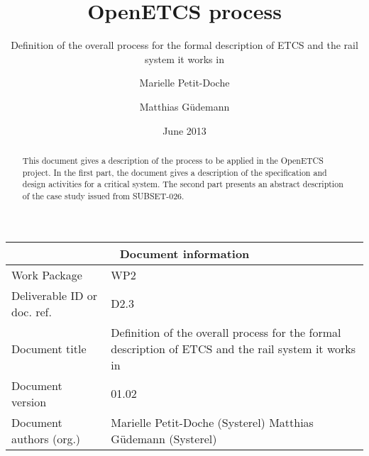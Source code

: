 \documentclass{template/openetcs_article}
\begin{document}
\frontmatter
{}




\title{OpenETCS process}

\subtitle{Definition of the overall process for the formal description of ETCS and the rail system it works in}

\date{June 2013}


\author{Marielle Petit-Doche}

\author{Matthias Güdemann}

 


\begin{abstract}
This document gives a description of the process to be applied in the OpenETCS project. In the first part, the document gives a description of the specification and design activities for a critical system. The second part presents an abstract description of the case study issued from SUBSET-026.

\end{abstract}

\maketitle
\tableofcontents
\listoffiguresandtables
\newpage


\begin{tabular}{|p{4.4cm}|p{8.7cm}|}
\hline
\multicolumn{2}{|c|}{Document information} \\
\hline
Work Package &  WP2  \\
Deliverable ID or doc. ref. & D2.3\\
\hline
Document title & Definition of the overall process for the formal description of ETCS and the rail system it works in \\
Document version & 01.02 \\
Document authors (org.)  & Marielle Petit-Doche (Systerel) Matthias Güdemann (Systerel) \\
\hline
\end{tabular}
\end{document}

